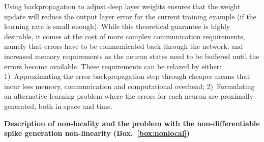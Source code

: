 \documentclass[journal,onecolumn,11pt]{IEEEtran}
\newcommand{\refbox}[1]{{\color{blue!70}(Box.~\ref{#1})}}
\begin{document}
Using backpropagation to adjust deep layer weights ensures that the weight update  will reduce the output layer error for the current training example (if the learning rate is small enough).
While this theoretical guarantee is highly desirable, it comes at the cost of more complex communication requirements, namely that errors have to be communicated back through the network, and increased memory requirements as the neuron states need to be buffered until the errors become available.
These requirements can be relaxed by either:
1)~Approximating the error backpropagation step through cheaper means that incur less memory, communication and computational overhead;
2)~Formulating an alternative learning problem where the errors for each neuron are proximally generated, both in space and time.

{\bf Description of non-locality and the problem with the non-differentiable spike generation non-linearity \refbox{box:nonlocal}}
\end{document}
